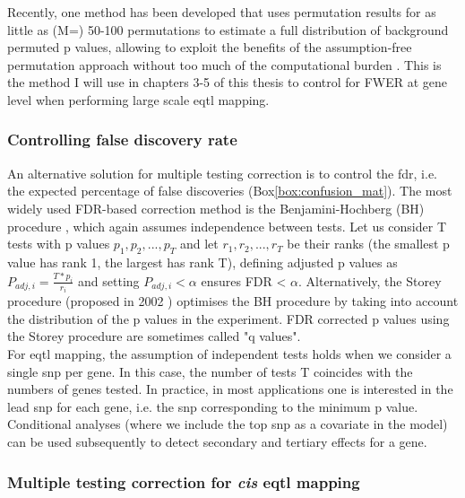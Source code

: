Recently, one method has been developed that uses permutation results for as little as (M=) 50-100 permutations to estimate a full distribution of background permuted p values, allowing to exploit the benefits of the assumption-free permutation approach without too much of the computational burden \cite{ongen2016fast}. 
This is the method I will use in chapters 3-5 of this thesis to control for FWER at gene level when performing large scale \gls{eqtl} mapping.

\subsubsection{Controlling false discovery rate}

An alternative solution for multiple testing correction is to control the \gls{fdr}, i.e. the expected percentage of false discoveries (Box\ref{box:confusion_mat}).
The most widely used FDR-based correction method is the Benjamini-Hochberg (BH) procedure \cite{benjamini1995controlling}, which again assumes independence between tests. 
Let us consider T tests with p values $p_1, p_2, ..., p_T$ and let $r_1, r_2, ..., r_T$ be their ranks (the smallest p value has rank 1, the largest has rank T), defining adjusted p values as $P_{adj,i} = \frac{T*p_i}{r_i} $ and setting $P_{adj,i} <\alpha$ ensures FDR < $\alpha$.
Alternatively, the Storey procedure (proposed in 2002 \cite{storey2002direct}) optimises the BH procedure by taking into account the distribution of the p values in the experiment.
FDR corrected p values using the Storey procedure are sometimes called "q values".\\


For \gls{eqtl} mapping, the assumption of independent tests holds when we consider a single \gls{snp} per gene.
In this case, the number of tests T coincides with the numbers of genes tested.
In practice, in most applications one is interested in the lead \gls{snp} for each gene, i.e. the \gls{snp} corresponding to the minimum p value.
Conditional analyses (where we include the top \gls{snp} as a covariate in the model) can be used subsequently to detect secondary and tertiary effects for a gene.

\subsubsection{Multiple testing correction for \textit{cis} e\gls{qtl} mapping}

